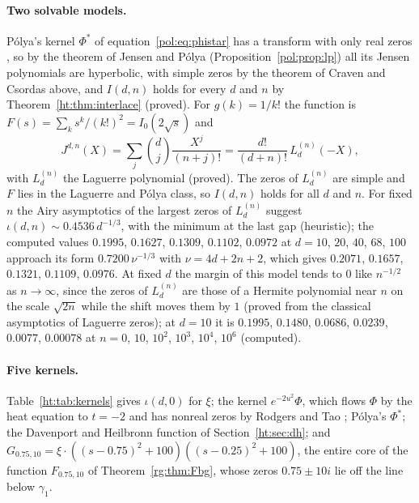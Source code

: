 \paragraph{Two solvable models.} P\'olya's kernel $\Phi^*$ of equation~\eqref{pol:eq:phistar} has a transform with only real zeros \cite{Polya}, so by the theorem of Jensen and P\'olya (Proposition~\ref{pol:prop:lp}) all its Jensen polynomials are hyperbolic, with simple zeros by the theorem of Craven and Csordas above, and $I(d,n)$ holds for every $d$ and $n$ by Theorem~\ref{ht:thm:interlace} (proved). For $g(k)=1/k!$ the function is $F(s)=\sum_ks^k/(k!)^2=I_0(2\sqrt s)$ and
\[
J^{d,n}(X)=\sum_j\binom dj\frac{X^j}{(n+j)!}=\frac{d!}{(d+n)!}\,L_d^{(n)}(-X),
\]
with $L_d^{(n)}$ the Laguerre polynomial (proved). The zeros of $L_d^{(n)}$ are simple and $F$ lies in the Laguerre and P\'olya class, so $I(d,n)$ holds for all $d$ and $n$. For fixed $n$ the Airy asymptotics of the largest zeros of $L_d^{(n)}$ suggest $\iota(d,n)\sim0.4536\,d^{-1/3}$, with the minimum at the last gap (heuristic); the computed values $0.1995$, $0.1627$, $0.1309$, $0.1102$, $0.0972$ at $d=10$, $20$, $40$, $68$, $100$ approach its form $0.7200\,\nu^{-1/3}$ with $\nu=4d+2n+2$, which gives $0.2071$, $0.1657$, $0.1321$, $0.1109$, $0.0976$. At fixed $d$ the margin of this model tends to $0$ like $n^{-1/2}$ as $n\to\infty$, since the zeros of $L_d^{(n)}$ are those of a Hermite polynomial near $n$ on the scale $\sqrt{2n}$ while the shift moves them by $1$ (proved from the classical asymptotics of Laguerre zeros); at $d=10$ it is $0.1995$, $0.1480$, $0.0686$, $0.0239$, $0.0077$, $0.00078$ at $n=0$, $10$, $10^2$, $10^3$, $10^4$, $10^6$ (computed).

\paragraph{Five kernels.} Table~\ref{ht:tab:kernels} gives $\iota(d,0)$ for $\xi$; the kernel $e^{-2u^2}\Phi$, which flows $\Phi$ by the heat equation to $t=-2$ and has nonreal zeros by Rodgers and Tao \cite{RodgersTao}; P\'olya's $\Phi^*$; the Davenport and Heilbronn function of Section~\ref{ht:sec:dh}; and $G_{0.75,10}=\xi\cdot((s-0.75)^2+100)((s-0.25)^2+100)$, the entire core of the function $F_{0.75,10}$ of Theorem~\ref{rg:thm:Fbg}, whose zeros $0.75\pm10i$ lie off the line below $\gamma_1$.

